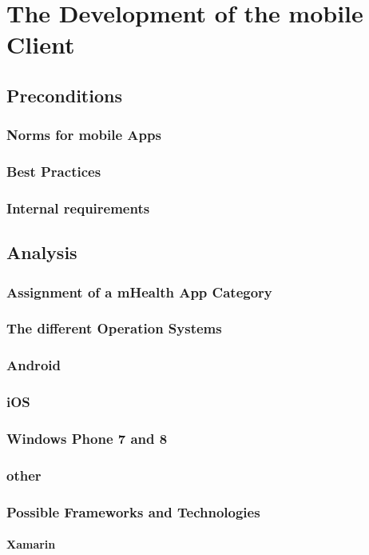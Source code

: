 \section{The Development of the mobile Client}
\subsection{Preconditions}
\subsubsection{Norms for mobile Apps}
\subsubsection{Best Practices}
\subsubsection{Internal requirements}
\subsection{Analysis}
\subsubsection{Assignment of a mHealth App Category}
\subsubsection{The different Operation Systems}
\subsubsection{Android}
\subsubsection{iOS}
\subsubsection{Windows Phone 7 and 8}
\subsubsection{other}
\subsubsection{Possible Frameworks and Technologies}
\paragraph{Xamarin}
